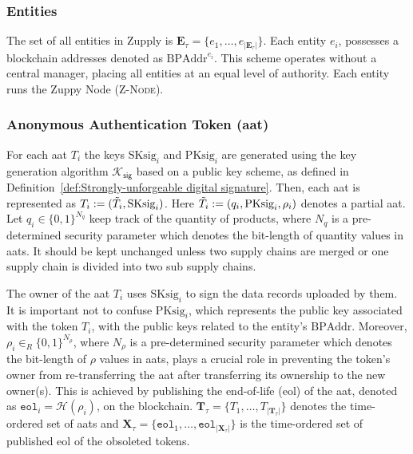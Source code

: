 \subsubsection{Entities}
\label{sec:Entities}
The set of all entities in Zupply is $\mathbf{E}_\tau = \{e_1, \dots, e_{|\mathbf{E}_\tau|}\}$. Each entity $e_i$, possesses a blockchain addresses denoted as $\text{BPAddr}^{e_i}$.  
This scheme operates without a central manager, placing all entities at an equal level of authority. Each entity runs the Zuppy Node (\textsc{Z-Node}).

\subsubsection{Anonymous Authentication Token (\gls{aat})}

For each \gls{aat} $T_i$  the keys $\text{SKsig}_{i}$ and $\text{PKsig}_{i}$ are generated using the key generation algorithm $\mathcal{K}_\mathsf{sig}$ based on a public key scheme, as defined in Definition~\ref{def:Strongly-unforgeable digital signature}.  Then, each \gls{aat} is represented as $T_i := (\Tilde{T}_i, \text{SKsig}_{i})$. Here $\Tilde{T}_i := (q_i, \text{PKsig}_{i}, \rho_i)$ denotes a partial \gls{aat}. Let $q_i \in \{0, 1\}^{N_q}$ keep track of the quantity of products, where ${N_q}$ is a  pre-determined security parameter which denotes the bit-length of quantity values in \glspl{aat}. It should be kept unchanged unless two supply chains are merged or one supply chain is divided into two sub supply chains. 

The owner of the \gls{aat} $T_i$ uses $\text{SKsig}_{i}$ to sign the data records uploaded by them. It is important not to confuse $\text{PKsig}_{i}$, which represents the public key associated with the token $T_i$, with the public keys related to the entity's $\text{BPAddr}$. 
Moreover, $\rho_i \in_R \{0, 1\}^{N_\rho}$, where ${N_\rho}$ is a  pre-determined security parameter which denotes the bit-length of $\rho$ values in \glspl{aat}, plays a crucial role in preventing the token's owner from re-transferring the \gls{aat} after transferring its ownership to the new owner(s). This is achieved by publishing the end-of-life (\gls{eol}) of the \gls{aat}, denoted as $\texttt{eol}_i = \mathcal{H}(\rho_i)$, on the blockchain. %
$\mathbf{T}_\tau = \{T_1, \dots, T_{|\mathbf{T}_\tau|}\}$ denotes the time-ordered set of \gls{aat}s  and 
$\mathbf{X}_\tau = \{\texttt{eol}_1, \dots, \texttt{eol}_{|\mathbf{X}_\tau|}\}$ is the time-ordered set of published \gls{eol} of the obsoleted tokens. %


